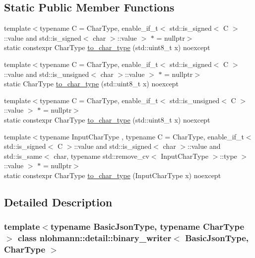 \subsection*{Static Public Member Functions}
\begin{DoxyCompactItemize}
\item 
{\footnotesize template$<$typename C  = Char\+Type, enable\+\_\+if\+\_\+t$<$ std\+::is\+\_\+signed$<$ C $>$\+::value and std\+::is\+\_\+signed$<$ char $>$\+::value $>$ $\ast$  = nullptr$>$ }\\static constexpr Char\+Type \mbox{\hyperlink{classnlohmann_1_1detail_1_1binary__writer_ab77aa48692bd4e64e4f051ce6aeb6d2d}{to\+\_\+char\+\_\+type}} (std\+::uint8\+\_\+t x) noexcept
\item 
{\footnotesize template$<$typename C  = Char\+Type, enable\+\_\+if\+\_\+t$<$ std\+::is\+\_\+signed$<$ C $>$\+::value and std\+::is\+\_\+unsigned$<$ char $>$\+::value $>$ $\ast$  = nullptr$>$ }\\static Char\+Type \mbox{\hyperlink{classnlohmann_1_1detail_1_1binary__writer_a5e46f0dd3550901b15cf85265808d1ec}{to\+\_\+char\+\_\+type}} (std\+::uint8\+\_\+t x) noexcept
\item 
{\footnotesize template$<$typename C  = Char\+Type, enable\+\_\+if\+\_\+t$<$ std\+::is\+\_\+unsigned$<$ C $>$\+::value $>$ $\ast$  = nullptr$>$ }\\static constexpr Char\+Type \mbox{\hyperlink{classnlohmann_1_1detail_1_1binary__writer_ab77aa48692bd4e64e4f051ce6aeb6d2d}{to\+\_\+char\+\_\+type}} (std\+::uint8\+\_\+t x) noexcept
\item 
{\footnotesize template$<$typename Input\+Char\+Type , typename C  = Char\+Type, enable\+\_\+if\+\_\+t$<$ std\+::is\+\_\+signed$<$ C $>$\+::value and std\+::is\+\_\+signed$<$ char $>$\+::value and std\+::is\+\_\+same$<$ char, typename std\+::remove\+\_\+cv$<$ Input\+Char\+Type $>$\+::type $>$\+::value $>$ $\ast$  = nullptr$>$ }\\static constexpr Char\+Type \mbox{\hyperlink{classnlohmann_1_1detail_1_1binary__writer_a2c2b2132ce56b3b45593374b622baa67}{to\+\_\+char\+\_\+type}} (Input\+Char\+Type x) noexcept
\end{DoxyCompactItemize}


\subsection{Detailed Description}
\subsubsection*{template$<$typename Basic\+Json\+Type, typename Char\+Type$>$\newline
class nlohmann\+::detail\+::binary\+\_\+writer$<$ Basic\+Json\+Type, Char\+Type $>$}

